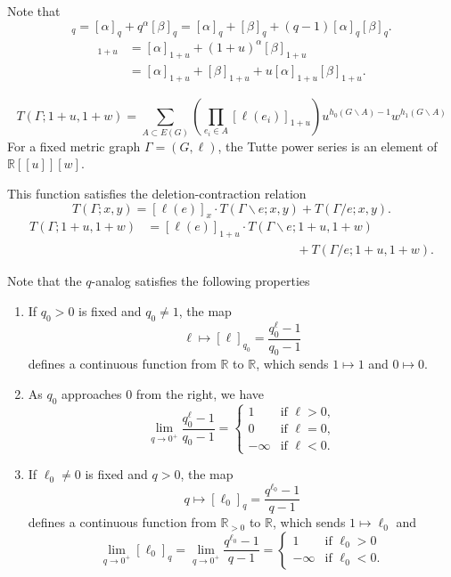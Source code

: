\documentclass{amsart}
\theoremstyle{definition}
\newcommand{\RR}{\mathbb{R}}
\begin{document}
Note that
\begin{equation*}
[\alpha + \beta]_q =  [\alpha]_q + q^{\alpha} [\beta]_q
 = [\alpha]_q + [\beta]_q + (q-1) [\alpha]_q [\beta]_q .
\end{equation*}
\begin{align*}
[\alpha + \beta]_{1+u} &=  [\alpha]_{1+u} + (1+u)^{\alpha} [\beta]_{1+u} \\
 &= [\alpha]_{1+u} + [\beta]_{1+u} + u [\alpha]_{1+u} [\beta]_{1+u}.
\end{align*}


\begin{equation*}
T(\Gamma; 1+u,1+w) = \sum_{A \subset E(G)} \left( \prod_{e_i \in A} [\ell(e_i)]_{1+u} \right)
u^{h_0(G\backslash A) - 1}w^{h_1(G\backslash A)}
\end{equation*}
For a fixed metric graph $\Gamma = (G,\ell)$, the Tutte power series is an element of 
$\RR[[u]][w]$.

This function satisfies the deletion-contraction relation
\begin{equation*}
T(\Gamma; x,y) = [\ell(e)]_x \cdot T(\Gamma \backslash e; x,y) + T(\Gamma / e; x,y) .
\end{equation*}
\begin{align*}
T({\Gamma};1+u,1+w) &= 
[\ell(e)]_{1+u} \cdot T(\Gamma \backslash e; 1+u,1+w) \\
&\qquad\qquad\qquad\qquad\qquad\qquad
 + T(\Gamma / e; 1+u,1+w) .
\end{align*}

Note that the $q$-analog satisfies the following properties
\begin{enumerate}
\item If $q_0>0$ is fixed and $q_0 \neq 1$, the map 
$$\ell \mapsto [\ell]_{q_0} = \frac{q_0^\ell - 1}{q_0 - 1}$$
defines a continuous function from $\RR$ to $\RR$,
which sends $1 \mapsto 1$ and $0 \mapsto 0$.

\item As $q_0$ approaches $0$ from the right,
we have
$$ \lim_{q \to 0^+} \frac{q_0^\ell - 1}{q_0 - 1} = \begin{cases}
1 &\text{if } \ell > 0, \\
0 &\text{if } \ell = 0, \\
-\infty &\text{if } \ell < 0.
\end{cases} $$

\item If $\ell_0\neq 0$ is fixed and $q > 0$,
the map 
$$q \mapsto [\ell_0]_q = \frac{q^{\ell_0} - 1}{q - 1}$$
defines a continuous function from $\RR_{>0}$ to $\RR$,
which sends $1 \mapsto \ell_0$ and 
$$ \lim_{q \to 0^+} [\ell_0]_q  = 
\lim_{q \to 0^+} \frac{q^{\ell_0} - 1}{q - 1} =
\begin{cases}
 1 &\text{if } \ell_0 > 0 \\
 -\infty &\text{if } \ell_0 <0.
\end{cases}$$
\end{enumerate}
\end{document}

